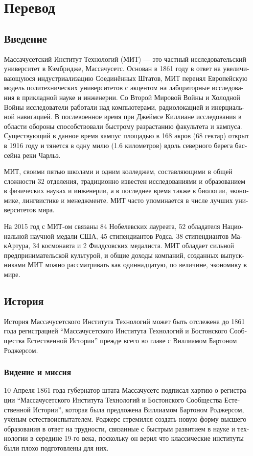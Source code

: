 \section{Перевод}

\begin{russian}

  \subsection{Введение}


Массачусетский Институт Технологий (МИТ) --- это частный исследовательский университет в Кэмбридже, Массачусетс. Основан в 1861 году в ответ на увеличивающуюся индустриализацию Соединённых Штатов, МИТ перенял Европейскую модель политехнических университетов с акцентом на лабораторные исследования в прикладной науке и инженерии. Со Второй Мировой Войны и Холодной Войны исследователи работали над компьютерами, радиолокацией и инерциальной навигацией. В послевоенное время при Джеймсе Киллиане исследования в области обороны способствовали быстрому разрастанию факультета и кампуса. Существующий в данное время кампус площадью в 168 акров (68 гектар) открыт в 1916 году и тянется в одну милю (1.6 километров) вдоль северного берега бассейна реки Чарльз.

МИТ, своими пятью школами и одним колледжем, составляющими в общей сложности 32 отделения, традиционно известен исследованиями и образованием в физических науках и инженерии, а в последнее время также в биологии, экономике, лингвистике и менеджменте. МИТ часто упоминается в числе лучших университетов мира.

На 2015 год с МИТ-ом связаны 84 Нобелевских лауреата, 52 обладателя Национальной научной медали США, 45 стипендиантов Родса, 38 стипендиантов МакАртура, 34 космонавта и 2 Филдсовских медалиста. МИТ обладает сильной предпринимательской культурой, и общие доходы компаний, созданных выпускниками МИТ можно рассматривать как одиннадцатую, по величине, экономику в мире.

\subsection{История}
История Массачусетского Института Технологий может быть отслежена до 1861 года регистрацией ``Массачусетского Института Технологий и Бостонского Сообщества Естественной Истории'' прежде всего во главе с Виллиамом Бартоном Роджерсом.

\subsubsection{Видение и миссия}

10 Апреля 1861 года губернатор штата Массачусетс подписал хартию о регистрации ``Массачусетского Института Технологий и Бостонского Сообщества Естественной Истории'', которая была предложена Виллиамом Бартоном Роджерсом, учёным естествоиспытателем. Роджерс стремился создать новую форму высшего образования в ответ на трудности, связанные с быстрым развитием в науке и технологии в середине 19-го века, поскольку он верил что классические институты были плохо подготовлены для них.
\end{russian}
